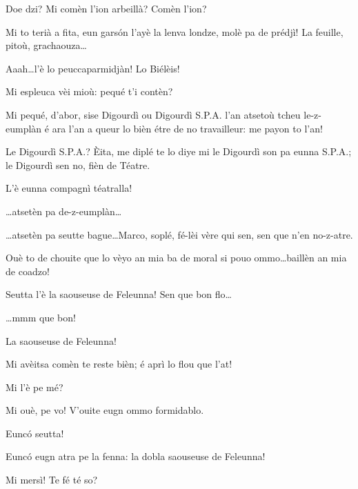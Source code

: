 \begin{drama}
\Cimaspeaks {} Doe dzi? Mi comèn l'ion arbeillà? Comèn l'ion?

\Jeanspeaks Mi to terià a fita, eun gars\'on l'ayè la lenva londze, molè pa de prédjì! La feuille, pitoù, grachaouza\ldots

\Cimaspeaks {} Aaah\ldots l'è lo peuccaparmidjàn! Lo Biélèis!

\Marcospeaks Mi espleuca vèi mioù: pequé t'i contèn?

\Jeanspeaks Mi pequé, d'abor, sise Digourdì ou Digourdì S.P.A. l’an atsetoù tcheu le-z-eumplàn é ara l'an a queur lo bièn étre de no travailleur: me payon to l'an!

\Marcospeaks Le Digourdì S.P.A.? Èita, me diplé te lo diye mi le Digourdì son pa eunna S.P.A.; le Digourdì sen no, fièn de Téatre.

\Cimaspeaks L'è eunna compagnì téatralla!

\Marcospeaks \ldots atsetèn pa de-z-eumplàn\ldots

\Cimaspeaks \ldots atsetèn pa seutte bague\ldots Marco, soplé, fé-lèi vère qui sen, sen que n'en no-z-atre.

\Marcospeaks Ouè to de chouite que lo vèyo an mia ba de moral si pouo ommo\ldots baillèn an mia de coadzo!


\Cimaspeaks {} Seutta l'è la saouseuse de Feleunna! Sen que bon flo\ldots

\Jeanspeaks {} \ldots mmm que bon!

\Cimaspeaks La saouseuse de Feleunna!

 
 Mi avèitsa comèn te reste bièn; é aprì lo flou que l'at!

\Jeanspeaks Mi l'è pe mé?

\Cimaspeaks Mi ouè, pe vo! V'ouite eugn ommo formidablo.


\Marcospeaks Eunc\'o seutta!

\Cimaspeaks Eunc\'o eugn atra pe la fenna: la dobla saouseuse de Feleunna!

\Jeanspeaks Mi mersì! Te fé té so?


\end{drama}
